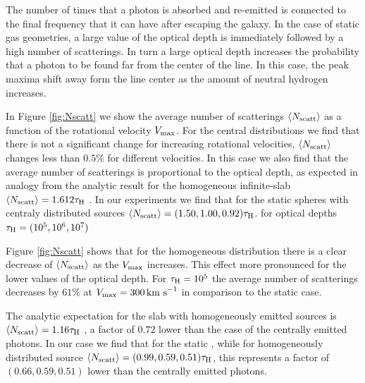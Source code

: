 \documentclass[usenatbib]{mn2e}
\newcommand{\ly}{{\ifmmode{{\rm Ly}\alpha~}\else{Ly$\alpha$~}\fi}}
\newcommand{\kms}{{\ifmmode{{\mathrm{\,km\ s}^{-1}}}\else{\,km~s$^{-1}$}\fi}}
\begin{document}
The number of times that a \ly photon is absorbed and re-emitted is
connected to the final frequency that it can have after escaping the
galaxy. In the case of static gas geometries, a large value of the
optical depth is immediately followed by a high number of
scatterings. In turn a large optical depth increases the probability
that a \ly photon to be found far from the center of the line. In this
case, the peak maxima shift away form the line center as the amount of
neutral hydrogen increases.


In Figure \ref{fig:Nscatt} we show the average number of scatterings
$\langle N_{\rm scatt}\rangle$ as a function of the rotational velocity
$V_{\rm max}$. For the central distributions we find that there is not
a significant change for increasing rotational
velocities, $\langle N_{\rm scatt}\rangle$ changes less than $0.5\%$
for different velocities. In this case we also find that the average
number of scatterings is proportional to the optical depth, as
expected in analogy from the analytic result for the homogeneous
infinite-slab $\langle N_{\rm  scatt}\rangle=1.612\tau_{\rm   H}$
\citep{Adams72,Harrington73}. In our experiments we find  that for the
static spheres with centraly distributed sources $\langle N_{\rm
  scatt}\rangle= (1.50, 1.00, 0.92)\tau_{\rm   H}$. for optical depths
$\tau_{\rm H} = (10^{5}, 10^{6}, 10^{7})$


Figure \ref{fig:Nscatt} shows that for the homogeneous distribution
there is a clear decrease of $\langle N_{\rm  scatt}\rangle$ as the
$V_{\rm max}$ increases. This effect more pronounced for the lower
values of the optical depth. For $\tau_{\rm H}=10^5$ the average
number of scatterings decreases by $61\%$ at $V_{\rm max}=300\kms$ in
comparison to the static case. 

The analytic expectation for the slab with homogeneously emitted
sources is $\langle N_{\rm  scatt}\rangle=1.16\tau_{\rm   H}$
\citep{Harrington73}, a factor of $0.72$ lower than the case of the
centrally emitted photons. In our case we find that for the static
, while for homogeneously distributed source $\langle N_{\rm
  scatt}\rangle= (0.99, 0.59, 0.51)\tau_{\rm   H}$, this represents 
  a factor of $(0.66, 0.59, 0.51)$ lower than the centrally emitted photons.
\end{document}
